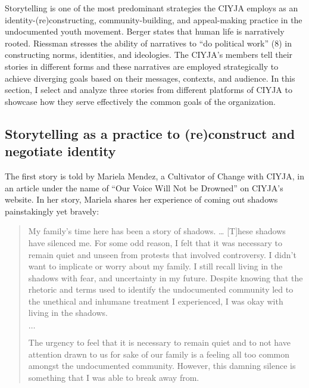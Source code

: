 \documentclass[12pt]{article}
\begin{document}
\begin{flushleft}
Storytelling is one of the most predominant strategies the CIYJA employs as an identity-(re)constructing, community-building, and appeal-making practice in the undocumented youth movement.
Berger states that human life is narratively rooted. %
Riessman stresses the ability of narratives to ``do political work'' (8) in constructing norms, identities, and ideologies. %
The CIYJA’s members tell their stories in different forms and these narratives are employed strategically to achieve diverging goals based on their messages, contexts, and audience.
In this section, I select and analyze three stories from different platforms of CIYJA to showcase how they serve effectively the common goals of the organization.

\subsection*{Storytelling as a practice to (re)construct and negotiate identity}

The first story is told by Mariela Mendez, a Cultivator of Change with CIYJA, in an article under the name of ``Our Voice Will Not be Drowned'' on CIYJA's website. In her story, Mariela shares her experience of coming out shadows painstakingly yet bravely:

\begin{quotation}
    \noindent
    My family's time here has been a story of shadows. … [T]hese shadows have silenced me.
    For some odd reason, I felt that it was necessary to remain quiet and unseen from protests that involved controversy. 
    I didn’t want to implicate or worry about my family.
    I still recall living in the shadows with fear, and uncertainty in my future.
    Despite knowing that the rhetoric and terms used to identify the undocumented community led to the unethical and inhumane treatment I experienced, I was okay with living in the shadows.

    \noindent $\ldots$
    
    \noindent
    The urgency to feel that it is necessary to remain quiet and to not have attention drawn to us for sake of our family is a feeling all too common amongst the undocumented community.
    However, this damning silence is something that I was able to break away from.
\end{quotation} %


\end{flushleft}
\end{document}

